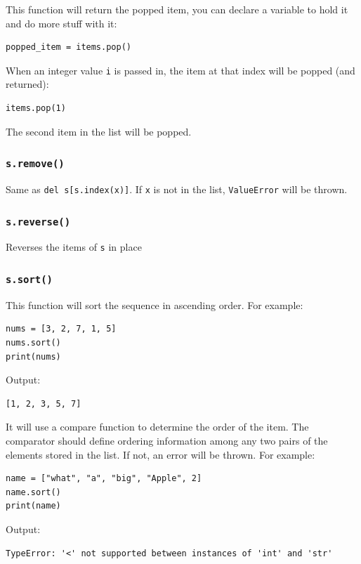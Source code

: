 \documentclass[12pt]{book}
\begin{document}
This function will return the popped item, you can declare a variable to hold it and do more stuff with it:
\begin{verbatim}
popped_item = items.pop()
\end{verbatim}

When an integer value \texttt{i} is passed in, the item at that index will be popped (and returned):
\begin{verbatim}
items.pop(1)
\end{verbatim}
The second item in the list will be popped.
\subsubsection{\texttt{s.remove()}}
\label{sec:orgea46e79}
Same as \texttt{del s[s.index(x)]}. If \texttt{x} is not in the list, \texttt{ValueError} will be thrown.
\subsubsection{\texttt{s.reverse()}}
\label{sec:orgcbc762b}
Reverses the items of \texttt{s} in place
\subsubsection{\texttt{s.sort()}}
\label{sec:org0f2a85a}
This function will sort the sequence in ascending order. For example:
\begin{verbatim}
nums = [3, 2, 7, 1, 5]
nums.sort()
print(nums)
\end{verbatim}
Output:
\begin{verbatim}
[1, 2, 3, 5, 7]
\end{verbatim}

It will use a compare function to determine the order of the item. The comparator should define ordering information among any two pairs of the elements stored in the list. If not, an error will be thrown. For example:
\begin{verbatim}
name = ["what", "a", "big", "Apple", 2]
name.sort()
print(name)
\end{verbatim}
Output:
\begin{verbatim}
TypeError: '<' not supported between instances of 'int' and 'str'
\end{verbatim}
\end{document}
